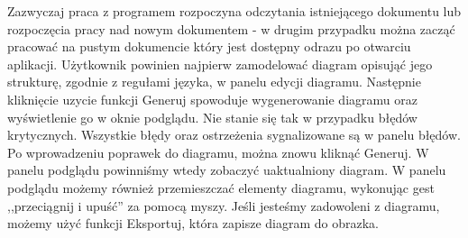 Zazwyczaj praca z programem rozpoczyna odczytania istniejącego dokumentu lub rozpoczęcia pracy nad nowym dokumentem - w drugim przypadku można zacząć pracować na pustym dokumencie który jest dostępny odrazu po otwarciu aplikacji. Użytkownik powinien najpierw zamodelować diagram opisująć jego strukturę, zgodnie z regułami języka, w panelu edycji diagramu. Następnie kliknięcie uzycie funkcji Generuj spowoduje wygenerowanie diagramu oraz wyświetlenie go w oknie podglądu. Nie stanie się tak w przypadku błędów krytycznych. Wszystkie błędy oraz ostrzeżenia sygnalizowane są w panelu błędów. Po wprowadzeniu poprawek do diagramu, można znowu kliknąć Generuj. W panelu podglądu powinniśmy wtedy zobaczyć uaktualniony diagram. W panelu podglądu możemy również przemieszczać elementy diagramu, wykonując gest ,,przeciągnij i upuść'' za pomocą myszy. Jeśli jesteśmy zadowoleni z diagramu, możemy użyć funkcji Eksportuj, która zapisze diagram do obrazka.
